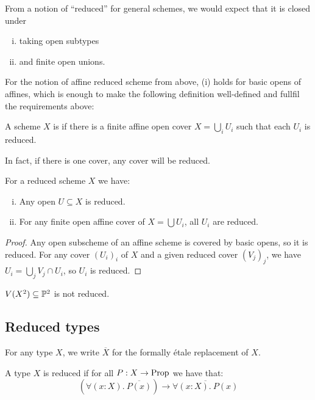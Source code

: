 From a notion of ``reduced'' for general schemes, we would expect that it is closed under
\begin{enumerate}[(i)]
\item taking open subtypes
\item and finite open unions.
\end{enumerate}

For the notion of affine reduced scheme from above, (i) holds for basic opens of affines,
which is enough to make the following definition well-defined and fullfil the requirements above:

\begin{definition}
  A scheme $X$ is  if there is a finite affine open cover $X=\bigcup_i U_i$ such that each $U_i$ is reduced.
\end{definition}

In fact, if there is one cover, any cover will be reduced.

\begin{remark}
  For a reduced scheme $X$ we have:
  \begin{enumerate}[(i)]
  \item Any open $U\subseteq X$ is reduced.
  \item For any finite open affine cover of $X=\bigcup U_i$, all $U_i$ are reduced.
  \end{enumerate}
\end{remark}

\begin{proof}
  Any open subscheme of an affine scheme is covered by basic opens, so it is reduced.
  For any cover $(U_i)_i$ of $X$ and a given reduced cover $(V_j)_j$, we have $U_i=\bigcup_j V_j\cap U_i$, so $U_i$ is reduced.
\end{proof}

\begin{example}
  $V(X^2)\subseteq \mathbb{P}^2$ is not reduced.
\end{example}


\subsection{Reduced types}

For any type $X$, we write $\overline{X}$ for the formally étale replacement of $X$.

\begin{definition}
A type $X$ is reduced if for all $P:X\to \mathrm{Prop}$ we have that:
\[(\forall(x:X).\ \overline{P(x)}) \to \overline{\forall(x:X).\ P(x)}\]
\end{definition}

